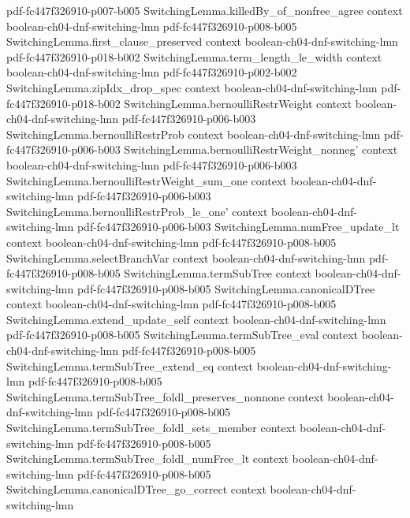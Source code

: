 \begin{lemma}
{    pdf-fc447f326910-p007-b005}
\proofstep
  {SwitchingLemma.killedBy_of_nonfree_agree}
  {context}
  {boolean-ch04-dnf-switching-lmn}
  {pdf-fc447f326910-p008-b005}
\proofstep
  {SwitchingLemma.first_clause_preserved}
  {context}
  {boolean-ch04-dnf-switching-lmn}
  {pdf-fc447f326910-p018-b002}
\proofstep
  {SwitchingLemma.term_length_le_width}
  {context}
  {boolean-ch04-dnf-switching-lmn}
  {pdf-fc447f326910-p002-b002}
\proofstep
  {SwitchingLemma.zipIdx_drop_spec}
  {context}
  {boolean-ch04-dnf-switching-lmn}
  {pdf-fc447f326910-p018-b002}
\proofstep
  {SwitchingLemma.bernoulliRestrWeight}
  {context}
  {boolean-ch04-dnf-switching-lmn}
  {pdf-fc447f326910-p006-b003}
\proofstep
  {SwitchingLemma.bernoulliRestrProb}
  {context}
  {boolean-ch04-dnf-switching-lmn}
  {pdf-fc447f326910-p006-b003}
\proofstep
  {SwitchingLemma.bernoulliRestrWeight_nonneg'}
  {context}
  {boolean-ch04-dnf-switching-lmn}
  {pdf-fc447f326910-p006-b003}
\proofstep
  {SwitchingLemma.bernoulliRestrWeight_sum_one}
  {context}
  {boolean-ch04-dnf-switching-lmn}
  {pdf-fc447f326910-p006-b003}
\proofstep
  {SwitchingLemma.bernoulliRestrProb_le_one'}
  {context}
  {boolean-ch04-dnf-switching-lmn}
  {pdf-fc447f326910-p006-b003}
\proofstep
  {SwitchingLemma.numFree_update_lt}
  {context}
  {boolean-ch04-dnf-switching-lmn}
  {pdf-fc447f326910-p008-b005}
\proofstep
  {SwitchingLemma.selectBranchVar}
  {context}
  {boolean-ch04-dnf-switching-lmn}
  {pdf-fc447f326910-p008-b005}
\proofstep
  {SwitchingLemma.termSubTree}
  {context}
  {boolean-ch04-dnf-switching-lmn}
  {pdf-fc447f326910-p008-b005}
\proofstep
  {SwitchingLemma.canonicalDTree}
  {context}
  {boolean-ch04-dnf-switching-lmn}
  {pdf-fc447f326910-p008-b005}
\proofstep
  {SwitchingLemma.extend_update_self}
  {context}
  {boolean-ch04-dnf-switching-lmn}
  {pdf-fc447f326910-p008-b005}
\proofstep
  {SwitchingLemma.termSubTree_eval}
  {context}
  {boolean-ch04-dnf-switching-lmn}
  {pdf-fc447f326910-p008-b005}
\proofstep
  {SwitchingLemma.termSubTree_extend_eq}
  {context}
  {boolean-ch04-dnf-switching-lmn}
  {pdf-fc447f326910-p008-b005}
\proofstep
  {SwitchingLemma.termSubTree_foldl_preserves_nonnone}
  {context}
  {boolean-ch04-dnf-switching-lmn}
  {pdf-fc447f326910-p008-b005}
\proofstep
  {SwitchingLemma.termSubTree_foldl_sets_member}
  {context}
  {boolean-ch04-dnf-switching-lmn}
  {pdf-fc447f326910-p008-b005}
\proofstep
  {SwitchingLemma.termSubTree_foldl_numFree_lt}
  {context}
  {boolean-ch04-dnf-switching-lmn}
  {pdf-fc447f326910-p008-b005}
\proofstep
  {SwitchingLemma.canonicalDTree_go_correct}
  {context}
  {boolean-ch04-dnf-switching-lmn}

\end{lemma}

